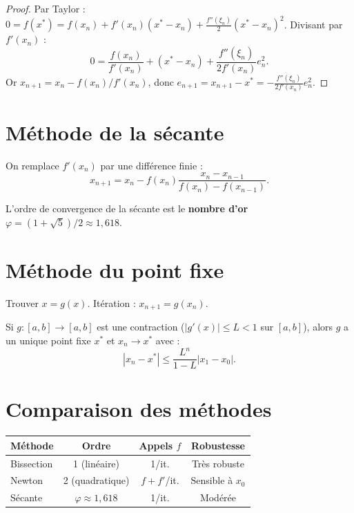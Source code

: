 \begin{proof}
Par Taylor : $0=f(x^*)=f(x_n)+f'(x_n)(x^*-x_n)+\frac{f''(\xi_n)}{2}(x^*-x_n)^2$. Divisant par $f'(x_n)$ :
\[
0 = \frac{f(x_n)}{f'(x_n)}+(x^*-x_n)+\frac{f''(\xi_n)}{2f'(x_n)}e_n^2.
\]
Or $x_{n+1}=x_n-f(x_n)/f'(x_n)$, donc $e_{n+1}=x_{n+1}-x^*=-\frac{f''(\xi_n)}{2f'(x_n)}e_n^2$.
\end{proof}

\section{M\'ethode de la s\'ecante}

\begin{definition}
On remplace $f'(x_n)$ par une diff\'erence finie :
\[
x_{n+1} = x_n - f(x_n)\frac{x_n-x_{n-1}}{f(x_n)-f(x_{n-1})}.
\]
\end{definition}

\begin{theoreme}
L'ordre de convergence de la s\'ecante est le \textbf{nombre d'or} $\varphi=(1+\sqrt{5})/2\approx 1{,}618$.
\end{theoreme}

\section{M\'ethode du point fixe}

\begin{definition}
Trouver $x=g(x)$. It\'eration : $x_{n+1}=g(x_n)$.
\end{definition}

\begin{theoreme}\label{thm:banach}
Si $g:[a,b]\to[a,b]$ est une contraction ($|g'(x)|\leq L<1$ sur $[a,b]$), alors $g$ a un unique point fixe $x^*$ et $x_n\to x^*$ avec :
\[
|x_n-x^*|\leq \frac{L^n}{1-L}|x_1-x_0|.
\]
\end{theoreme}

\section{Comparaison des m\'ethodes}

\begin{center}
\begin{tabular}{lccc}
\toprule
\textbf{M\'ethode} & \textbf{Ordre} & \textbf{Appels $f$} & \textbf{Robustesse} \\
\midrule
Bissection & 1 (lin\'eaire) & 1/it. & Tr\`es robuste \\
Newton & 2 (quadratique) & $f + f'$/it. & Sensible \`a $x_0$ \\
S\'ecante & $\varphi\approx 1{,}618$ & 1/it. & Mod\'er\'ee \\
\bottomrule
\end{tabular}
\end{center}

